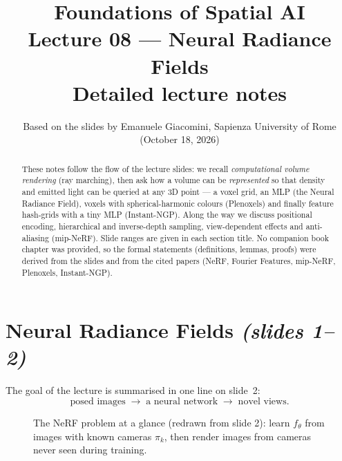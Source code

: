 \documentclass[11pt,a4paper]{article}
\title{\textbf{Foundations of Spatial AI}\\[2pt] Lecture 08 --- Neural Radiance Fields\\[2pt]\large Detailed lecture notes}
\author{Based on the slides by Emanuele Giacomini, Sapienza University of Rome (October 18, 2026)}
\date{}
\newcommand{\sref}[1]{\texorpdfstring{\emph{(slides #1)}}{(slides #1)}}
\theoremstyle{definition}
\theoremstyle{plain}
\begin{document}
\maketitle
\begin{abstract}\small
These notes follow the flow of the lecture slides: we recall \emph{computational volume rendering} (ray marching), then ask how a volume can be \emph{represented} so that density and emitted light can be queried at any 3D point --- a voxel grid, an MLP (the Neural Radiance Field), voxels with spherical-harmonic colours (Plenoxels) and finally feature hash-grids with a tiny MLP (Instant-NGP). Along the way we discuss positional encoding, hierarchical and inverse-depth sampling, view-dependent effects and anti-aliasing (mip-NeRF). Slide ranges are given in each section title. No companion book chapter was provided, so the formal statements (definitions, lemmas, proofs) were derived from the slides and from the cited papers (NeRF, Fourier Features, mip-NeRF, Plenoxels, Instant-NGP).
\end{abstract}
\tableofcontents
\newpage

\section{Neural Radiance Fields \sref{1--2}}

The goal of the lecture is summarised in one line on slide~2:
\[
\text{posed images}\;\longrightarrow\;\text{a neural network}\;\longrightarrow\;\text{novel views.}
\]

\begin{figure}[H]
\centering
{}
\caption{The NeRF problem at a glance (redrawn from slide 2): learn $f_\theta$ from images with known cameras $\pi_k$, then render images from cameras never seen during training.}
\end{figure}
\end{document}
